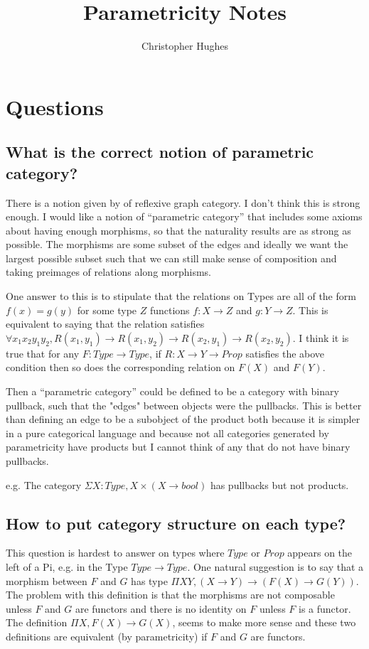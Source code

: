 \documentclass[12pt]{article} %
\title{Parametricity Notes}
\author{Christopher Hughes}
\theoremstyle{definition}
\theoremstyle{definition}
\theoremstyle{definition}
\theoremstyle{definition}
\begin{document}
\section{Questions}

\subsection{What is the correct notion of parametric category?}

There is a notion given by \cite{Hermida2014LogicalRA} of reflexive graph category. 
I don't think this is strong enough. I would like a notion of ``parametric category'' that
includes some axioms about having enough morphisms, so that the naturality results are as strong as
possible. The morphisms are some subset of the edges and ideally we want the largest 
possible subset such that we can still make sense of composition and taking preimages of relations
along morphisms.

One answer to this is to stipulate that the relations on Types are all of the form $f(x) = g(y)$ for 
some type $Z$ functions $f : X \rightarrow Z$ and $g : Y \rightarrow Z$. This is equivalent to saying
that the relation satisfies $\forall x_1 x_2 y_1 y_2, R(x_1, y_1) \rightarrow R(x_1, y_2) 
\rightarrow R(x_2, y_1) \rightarrow R(x_2, y_2)$.
I think it is true that for any $F : Type \rightarrow Type$, if $R : X \rightarrow Y \rightarrow Prop$
satisfies the above condition then so does the corresponding relation on $F(X)$ and $F(Y)$.

Then a ``parametric category'' could be defined to be a category with binary pullback, such that 
the "edges" between objects were the pullbacks. This is better than defining an edge to be a subobject 
of the product both because it is simpler in a pure categorical language and because not all categories
generated by parametricity have products but I cannot think of any that do not have binary pullbacks.

e.g. The category $\Sigma X : Type, X \times (X \to bool)$ has pullbacks but not products. 


\subsection{How to put category structure on each type?}

This question is hardest to answer on types where $Type$ or $Prop$ appears on the left of a Pi,
e.g. in the Type $Type\rightarrow Type$. One natural suggestion is to say that a morphism between
$F$ and $G$ has type $\Pi X Y, (X \rightarrow Y) \rightarrow (F(X) \rightarrow G(Y))$. The problem 
with this definition is that the morphisms are not composable unless $F$ and $G$ are functors and 
there is no identity on $F$ unless $F$ is a functor. The definition $\Pi X, F(X) \rightarrow G(X)$,
seems to make more sense and these two definitions are equivalent (by parametricity) if $F$ and
$G$ are functors.
\end{document}
